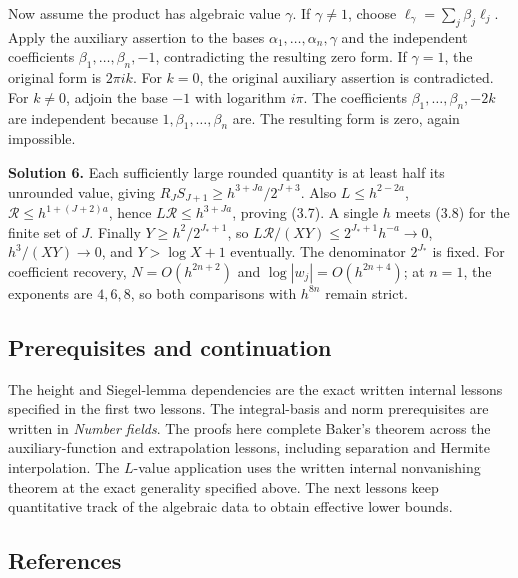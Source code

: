 \documentclass[
  11pt,
  a4paper,
]{article}
\begin{document}
Now assume the product has algebraic value \(\gamma\). If
\(\gamma\ne1\), choose \(\ell_\gamma=\sum_j\beta_j\ell_j\). Apply the
auxiliary assertion to the bases \(\alpha_1,\ldots,\alpha_n,\gamma\) and
the independent coefficients \(\beta_1,\ldots,\beta_n,-1\),
contradicting the resulting zero form. If \(\gamma=1\), the original
form is \(2\pi ik\). For \(k=0\), the original auxiliary assertion is
contradicted. For \(k\ne0\), adjoin the base \(-1\) with logarithm
\(i\pi\). The coefficients \(\beta_1,\ldots,\beta_n,-2k\) are
independent because \(1,\beta_1,\ldots,\beta_n\) are. The resulting form
is zero, again impossible.

\textbf{Solution 6.} Each sufficiently large rounded quantity is at
least half its unrounded value, giving
\(R_JS_{J+1}\ge h^{3+Ja}/2^{J+3}\). Also \(L\le h^{2-2a}\),
\(\mathcal R\le h^{1+(J+2)a}\), hence \(L\mathcal R\le h^{3+Ja}\),
proving (3.7). A single \(h\) meets (3.8) for the finite set of \(J\).
Finally \(Y\ge h^2/2^{J_*+1}\), so
\(L\mathcal R/(XY)\le2^{J_*+1}h^{-a}\to0\), \(h^3/(XY)\to0\), and
\(Y>\log X+1\) eventually. The denominator \(2^{J_*}\) is fixed. For
coefficient recovery, \(N=O(h^{2n+2})\) and \(\log|w_j|=O(h^{2n+4})\);
at \(n=1\), the exponents are \(4,6,8\), so both comparisons with
\(h^{8n}\) remain strict.

\subsection{Prerequisites and
continuation}\label{prerequisites-and-continuation}

The height and Siegel-lemma dependencies are the exact written internal
lessons specified in the first two lessons. The integral-basis and norm
prerequisites are written in \emph{Number fields}. The proofs here
complete Baker's theorem across the auxiliary-function and extrapolation
lessons, including separation and Hermite interpolation. The \(L\)-value
application uses the written internal nonvanishing theorem at the exact
generality specified above. The next lessons keep quantitative track of
the algebraic data to obtain effective lower bounds.

\subsection{References}\label{references}
\end{document}
